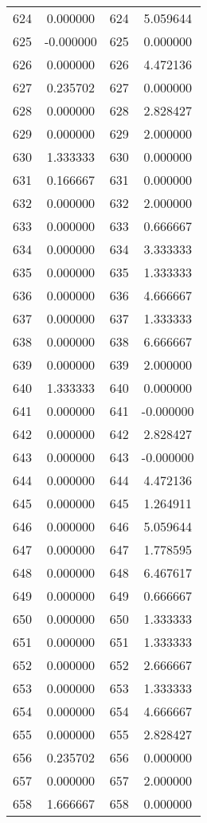 \documentclass[12pt]{article}
\begin{document}
\begin{longtable}{@{}cccc@{}}
624 & 0.000000 & 624 & 5.059644 \\
625 & -0.000000 & 625 & 0.000000 \\
626 & 0.000000 & 626 & 4.472136 \\
627 & 0.235702 & 627 & 0.000000 \\
628 & 0.000000 & 628 & 2.828427 \\
629 & 0.000000 & 629 & 2.000000 \\
630 & 1.333333 & 630 & 0.000000 \\
631 & 0.166667 & 631 & 0.000000 \\
632 & 0.000000 & 632 & 2.000000 \\
633 & 0.000000 & 633 & 0.666667 \\
634 & 0.000000 & 634 & 3.333333 \\
635 & 0.000000 & 635 & 1.333333 \\
636 & 0.000000 & 636 & 4.666667 \\
637 & 0.000000 & 637 & 1.333333 \\
638 & 0.000000 & 638 & 6.666667 \\
639 & 0.000000 & 639 & 2.000000 \\
640 & 1.333333 & 640 & 0.000000 \\
641 & 0.000000 & 641 & -0.000000 \\
642 & 0.000000 & 642 & 2.828427 \\
643 & 0.000000 & 643 & -0.000000 \\
644 & 0.000000 & 644 & 4.472136 \\
645 & 0.000000 & 645 & 1.264911 \\
646 & 0.000000 & 646 & 5.059644 \\
647 & 0.000000 & 647 & 1.778595 \\
648 & 0.000000 & 648 & 6.467617 \\
649 & 0.000000 & 649 & 0.666667 \\
650 & 0.000000 & 650 & 1.333333 \\
651 & 0.000000 & 651 & 1.333333 \\
652 & 0.000000 & 652 & 2.666667 \\
653 & 0.000000 & 653 & 1.333333 \\
654 & 0.000000 & 654 & 4.666667 \\
655 & 0.000000 & 655 & 2.828427 \\
656 & 0.235702 & 656 & 0.000000 \\
657 & 0.000000 & 657 & 2.000000 \\
658 & 1.666667 & 658 & 0.000000 \\

\end{longtable}
\end{document}
